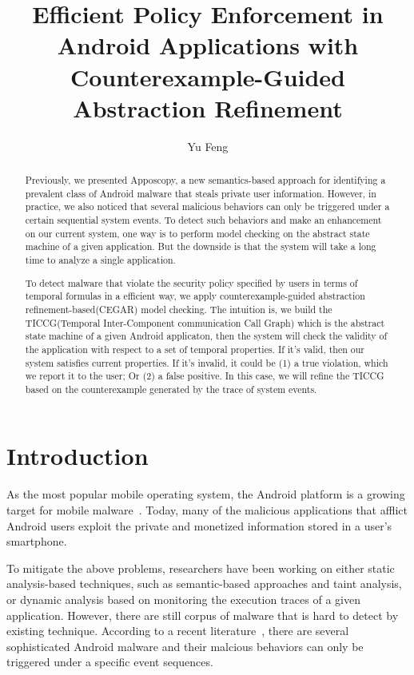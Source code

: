 \documentclass{article}
\begin{document}
\title{Efficient Policy Enforcement in Android Applications with Counterexample-Guided Abstraction Refinement}
\author{Yu Feng}

\maketitle

\begin{abstract}
Previously, we presented Apposcopy, a new semantics-based approach 
for identifying a prevalent class of Android malware that steals 
private user information. However, in practice, we also noticed 
that several malicious behaviors can only be triggered under a 
certain sequential system events. To detect such behaviors and make
an enhancement on our current system, one way is to perform model
checking on the abstract state machine of a given application.
But the downside is that the system will take a long time to analyze
a single application. 

To detect malware that violate the security policy specified by users 
in terms of temporal formulas in a efficient way, we apply 
counterexample-guided abstraction refinement-based(CEGAR) model 
checking. The intuition is, we build the TICCG(Temporal Inter-Component 
communication Call Graph) which is the abstract state machine of a given 
Android applicaton, then the system will check the validity of the application
with respect to a set of temporal properties. If it's valid, then 
our system satisfies current properties. If it's invalid, it could
be (1) a true violation, which we report it to the user; Or (2)
a false positive. In this case, we will refine the TICCG based on
the counterexample generated by the trace of system events.
\end{abstract}


\section{Introduction}
As  the most popular mobile operating system, the Android platform 
is a growing target for  mobile malware~\cite{usreport}.
Today, many of the malicious applications that afflict  Android users  exploit
the private and monetized information
stored in a user's smartphone. %

To mitigate the above problems, researchers have been working on either 
static analysis-based techniques, such as semantic-based approaches and taint analysis, 
or dynamic analysis based on monitoring the execution traces of a 
given application. However, there are still corpus of malware that is hard to detect 
by existing technique. According to a recent literature~\cite{pegasus}, there are
several sophisticated Android malware and their malcious behaviors can only 
be triggered under a specific event sequences.
\end{document}
